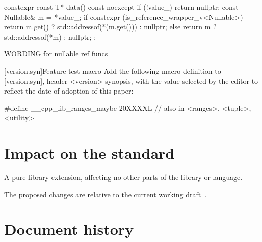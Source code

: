 \documentclass[a4paper,10pt,oneside,openany,final,article]{memoir}
\begin{document}
\begin{wording}
\begin{codeblock}
{    constexpr const T* data() const noexcept {
        if (!value_)
            return nullptr;
        const Nullable& m = *value_;
        if constexpr (is_reference_wrapper_v<Nullable>) {
            return m.get() ? std::addressof(*(m.get())) : nullptr;
        } else {
            return m ? std::addressof(*m) : nullptr;
        }
    }
};

\end{codeblock}

WORDING for nullable ref funcs


[version.syn]{Feature-test macro}
Add the following macro definition to [version.syn], header <version> synopsis, with the value selected by the editor to reflect the date of adoption of this paper:

\begin{codeblock}
  #define __cpp_lib_ranges_maybe 20XXXXL // also in <ranges>, <tuple>, <utility>
\end{codeblock}

\end{wording}

\chapter{Impact on the standard}

A pure library extension, affecting no other parts of the library or language.

The proposed changes are relative to the current working draft~\cite{N4910}.

\chapter*{Document history}
\end{document}
